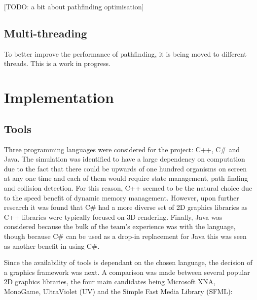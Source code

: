 \documentclass[a4paper, oneside, 11pt]{report}
\begin{document}
[TODO: a bit about pathfinding optimisation]

\section{Multi-threading}
To better improve the performance of pathfinding, it is being moved to different threads. This is a work in progress.

\chapter{Implementation} \label{implementation}

\section{Tools}\label{tools}
Three programming languages were considered for the project: C++, C\# and Java. The simulation was identified to have a large dependency on computation due to the fact that there could be upwards of one hundred organisms on screen at any one time and each of them would require state management, path finding and collision detection. For this reason, C++ seemed to be the natural choice due to the speed benefit of dynamic memory management. However, upon further research it was found that C\# had a more diverse set of 2D graphics libraries as C++ libraries were typically focused on 3D rendering. Finally, Java was considered because the bulk of the team's experience was with the language, though because C\# can be used as a drop-in replacement for Java this was seen as another benefit in using C\#.

Since the availability of tools is dependant on the chosen language, the decision of a graphics framework was next. A comparison was made between several popular 2D graphics libraries, the four main candidates being Microsoft XNA, MonoGame, UltraViolet (UV) and the Simple Fast Media Library (SFML):
\end{document}

